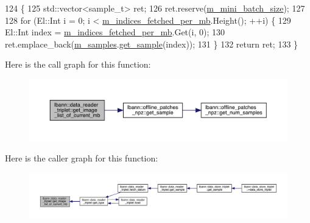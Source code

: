 \begin{DoxyCode}
124                                                                                                \{
125   std::vector<sample\_t> ret;
126   ret.reserve(\hyperlink{classlbann_1_1generic__data__reader_a96f87a7d09711ab3eee3940ff2aa36ec}{m\_mini\_batch\_size});
127 
128   \textcolor{keywordflow}{for} (El::Int i = 0; i < \hyperlink{classlbann_1_1generic__data__reader_a4ee1a159c74561c15a5e0c267ad3cc6a}{m\_indices\_fetched\_per\_mb}.Height(); ++i) \{
129     El::Int index = \hyperlink{classlbann_1_1generic__data__reader_a4ee1a159c74561c15a5e0c267ad3cc6a}{m\_indices\_fetched\_per\_mb}.Get(i, 0);
130     ret.emplace\_back(\hyperlink{classlbann_1_1data__reader__triplet_a1f414c6d80f6e48fc91f98db0531f1f8}{m\_samples}.\hyperlink{classlbann_1_1offline__patches__npz_a9c8ad05ffdf0d44ee1c9b61740dd42e3}{get\_sample}(index));
131   \}
132   \textcolor{keywordflow}{return} ret;
133 \}
\end{DoxyCode}
Here is the call graph for this function\+:\nopagebreak
\begin{figure}[H]
\begin{center}
\leavevmode
\includegraphics[width=350pt]{classlbann_1_1data__reader__triplet_a2fa95d7757541b63f5191c1ffa7b7112_cgraph}
\end{center}
\end{figure}
Here is the caller graph for this function\+:\nopagebreak
\begin{figure}[H]
\begin{center}
\leavevmode
\includegraphics[width=350pt]{classlbann_1_1data__reader__triplet_a2fa95d7757541b63f5191c1ffa7b7112_icgraph}
\end{center}
\end{figure}
\mbox{\label{classlbann_1_1data__reader__triplet_a6ed35c191d890569db4865424b8b0e82}} 
